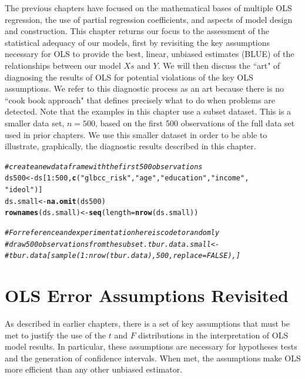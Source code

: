 \documentclass[11pt,openany]{book}\usepackage[]{graphicx}\usepackage[]{color}
\makeatletter
\newcommand{\hlnum}[1]{\textcolor[rgb]{0.686,0.059,0.569}{#1}}%
\newcommand{\hlstr}[1]{\textcolor[rgb]{0.192,0.494,0.8}{#1}}%
\newcommand{\hlcom}[1]{\textcolor[rgb]{0.678,0.584,0.686}{\textit{#1}}}%
\newcommand{\hlopt}[1]{\textcolor[rgb]{0,0,0}{#1}}%
\newcommand{\hlstd}[1]{\textcolor[rgb]{0.345,0.345,0.345}{#1}}%
\newcommand{\hlkwb}[1]{\textcolor[rgb]{0.69,0.353,0.396}{#1}}%
\newcommand{\hlkwc}[1]{\textcolor[rgb]{0.333,0.667,0.333}{#1}}%
\newcommand{\hlkwd}[1]{\textcolor[rgb]{0.737,0.353,0.396}{\textbf{#1}}}%
\newenvironment{kframe}{%
 \def\at@end@of@kframe{}%
 \ifinner\ifhmode%
  \def\at@end@of@kframe{\end{minipage}}%
  \begin{minipage}{\columnwidth}%
 \fi\fi%
 \def\FrameCommand##1{\hskip\@totalleftmargin \hskip-\fboxsep
 \colorbox{shadecolor}{##1}\hskip-\fboxsep
     \hskip-\linewidth \hskip-\@totalleftmargin \hskip\columnwidth}%
 \MakeFramed {\advance\hsize-\width
   \@totalleftmargin\z@ \linewidth\hsize
   \@setminipage}}%
 {\par\unskip\endMakeFramed%
 \at@end@of@kframe}
\newenvironment{knitrout}{}{} %
\renewenvironment{knitrout}{\begin{singlespace}}{\end{singlespace}}
\makeatother
\begin{document}
The previous chapters have focused on the mathematical bases of multiple OLS regression, the use of partial regression coefficients, and aspects of model design and construction. This chapter returns our focus to the assessment of the statistical adequacy of our models, first by revisiting the key assumptions necessary for OLS to provide the best, linear, unbiased estimates (BLUE) of the relationships between our model $Xs$ and $Y$. We will then discuss the ``art" of diagnosing the results of OLS for potential violations of the key OLS assumptions.  We refer to this diagnostic process as an art because there is no ``cook book approach" that defines precisely what to do when problems are detected. Note that the examples in this chapter use a subset dataset. This is a smaller data set, $n=500$, based on the first 500 observations of the full data set used in prior chapters. We use this smaller dataset in order to be able to illustrate, graphically, the diagnostic results described in this chapter.

\begin{knitrout}
\color{fgcolor}\begin{kframe}
\begin{alltt}
\hlcom{# create a new data frame with the first 500 observations}
\hlstd{ds500} \hlkwb{<-} \hlstd{ds[}\hlnum{1}\hlopt{:}\hlnum{500}\hlstd{,} \hlkwd{c}\hlstd{(}\hlstr{"glbcc_risk"}\hlstd{,} \hlstr{"age"}\hlstd{,} \hlstr{"education"}\hlstd{,} \hlstr{"income"}\hlstd{,}
    \hlstr{"ideol"}\hlstd{)]}
\hlstd{ds.small} \hlkwb{<-} \hlkwd{na.omit}\hlstd{(ds500)}
\hlkwd{rownames}\hlstd{(ds.small)} \hlkwb{<-} \hlkwd{seq}\hlstd{(}\hlkwc{length} \hlstd{=} \hlkwd{nrow}\hlstd{(ds.small))}

\hlcom{# For reference and experimentation here is code to randomly}
\hlcom{# draw 500 observations from the subset.  tbur.data.small <-}
\hlcom{# tbur.data[sample(1:nrow(tbur.data), 500, replace=FALSE),]}
\end{alltt}
\end{kframe}
\end{knitrout}

\section{OLS Error Assumptions Revisited} 

As described in earlier chapters, there is a set of key assumptions that must be met to justify the use of the $t$ and $F$ distributions in the interpretation of OLS model results. In particular, these assumptions are necessary for hypotheses tests and the generation of confidence intervals. When met, the assumptions make OLS more efficient than any other unbiased estimator. 
\end{document}
